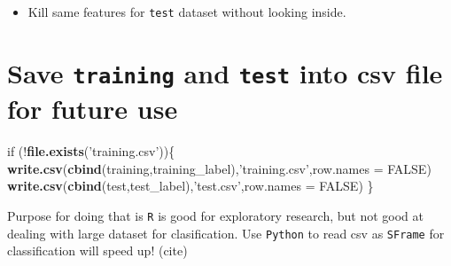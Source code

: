 \documentclass[]{article}
\newenvironment{Shaded}{\begin{snugshade}}{\end{snugshade}}
\newcommand{\KeywordTok}[1]{\textcolor[rgb]{0.13,0.29,0.53}{\textbf{{#1}}}}
\newcommand{\DataTypeTok}[1]{\textcolor[rgb]{0.13,0.29,0.53}{{#1}}}
\newcommand{\StringTok}[1]{\textcolor[rgb]{0.31,0.60,0.02}{{#1}}}
\newcommand{\OtherTok}[1]{\textcolor[rgb]{0.56,0.35,0.01}{{#1}}}
\newcommand{\NormalTok}[1]{{#1}}
\begin{document}
\begin{Shaded}
\end{Shaded}

\begin{itemize}
\itemsep1pt\parskip0pt
\item
  Kill same features for \texttt{test} dataset without looking inside.
\end{itemize}

\begin{Shaded}
\end{Shaded}

\section{Save \texttt{training} and \texttt{test} into csv file for
future use}\label{save-training-and-test-into-csv-file-for-future-use}

\begin{Shaded}
\begin{Highlighting}[]
\NormalTok{if (!}\KeywordTok{file.exists}\NormalTok{(}\StringTok{'training.csv'}\NormalTok{))\{}
    \KeywordTok{write.csv}\NormalTok{(}\KeywordTok{cbind}\NormalTok{(training,training_label),}\StringTok{'training.csv'}\NormalTok{,}\DataTypeTok{row.names =} \OtherTok{FALSE}\NormalTok{)}
    \KeywordTok{write.csv}\NormalTok{(}\KeywordTok{cbind}\NormalTok{(test,test_label),}\StringTok{'test.csv'}\NormalTok{,}\DataTypeTok{row.names =} \OtherTok{FALSE}\NormalTok{)}
\NormalTok{\}}
\end{Highlighting}
\end{Shaded}

Purpose for doing that is \texttt{R} is good for exploratory research,
but not good at dealing with large dataset for clasification. Use
\texttt{Python} to read csv as \texttt{SFrame} for classification will
speed up! (cite)
\end{document}
